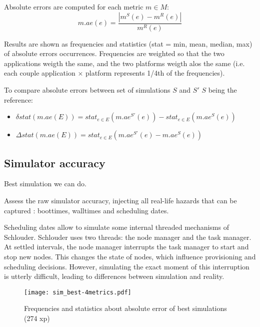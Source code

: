 {\begin{itemize}
\end{itemize}

Absolute errors are computed for each metric $m \in M$: 
$$m.ae(e) = \frac{| m^S(e) - m^R(e) |}{m^R(e)}$$

Results are shown as frequencies and statistics (stat = min, mean, median, max) 
of absolute errors occurrences. Frequencies are weighted so that the two applications
weigth the same, and the two platforms weigth alos the same 
(i.e. each couple application $\times$ platform represents 1/4th of the frequencies).

To compare absolute errors between set of simulations $S$ and $S'$
$S$ being the reference:
\begin{itemize}
 \item $\delta stat(m.ae(E)) = stat_{e \in E} ( m.ae^{S'}(e) ) - stat_{e \in E}( m.ae^S(e) )$
 \item $\Delta stat(m.ae(E)) = stat_{e \in E} ( m.ae^{S'}(e) - m.ae^S(e) )$
\end{itemize}




\subsection{Simulator accuracy}

Best simulation we can do.

Assess the raw simulator accuracy, injecting all real-life hazards that can be 
captured :
boottimes, walltimes and scheduling dates.

Scheduling dates allow to simulate some internal threaded mechanisms of 
Schlouder.
Schlouder uses two threads: the node manager and the task manager.
At settled intervals, the node manager interrupts the task manager to start and 
stop new nodes.
This changes the state of nodes, which influence provisioning and scheduling 
decisions.
However, simulating the exact moment of this interruption is utterly difficult, 
leading to differences between simulation and reality.


\begin{figure}
  \centering

  \texttt{[image: sim\_best-4metrics.pdf]}
  
  
  
\caption{Frequencies and statistics about absolute error of best simulations (274 xp)}
\end{figure} 

}
